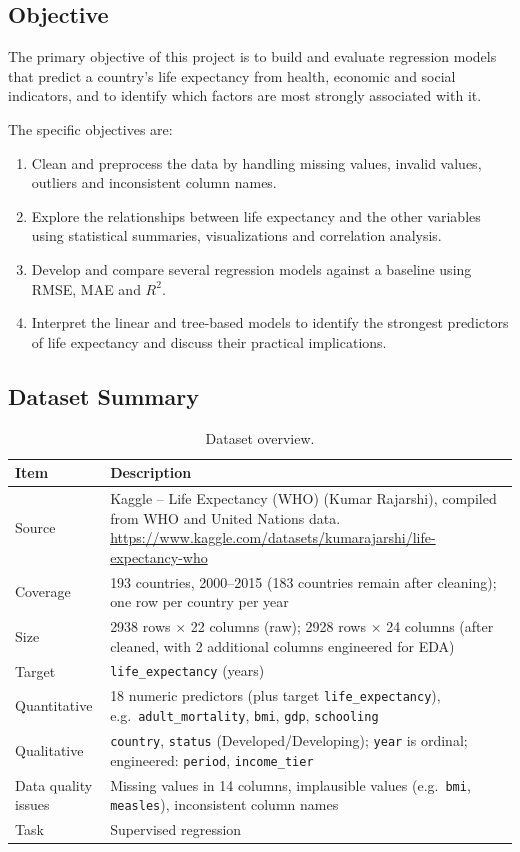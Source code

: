 \documentclass[12pt,a4paper]{article}
\begin{document}
\subsection{Objective}
The primary objective of this project is to build and evaluate regression models
that predict a country's life expectancy from health, economic and social
indicators, and to identify which factors are most strongly associated with it.

The specific objectives are:
\begin{enumerate}
  \item Clean and preprocess the data by handling missing values, invalid
        values, outliers and inconsistent column names.
  \item Explore the relationships between life expectancy and the other
        variables using statistical summaries, visualizations and correlation
        analysis.
  \item Develop and compare several regression models against a baseline using
        RMSE, MAE and $R^2$.
  \item Interpret the linear and tree-based models to identify the strongest
        predictors of life expectancy and discuss their practical implications.
\end{enumerate}

\subsection{Dataset Summary}
\begin{table}[H]\centering
\caption{Dataset overview.}
\begin{tabularx}{\textwidth}{lX}\toprule
\textbf{Item} & \textbf{Description}\\\midrule
Source & Kaggle -- Life Expectancy (WHO) (Kumar Rajarshi), compiled from WHO and United Nations data. \url{https://www.kaggle.com/datasets/kumarajarshi/life-expectancy-who}\\
Coverage & 193 countries, 2000--2015 (183 countries remain after cleaning); one row per country per year\\
Size & 2938 rows $\times$ 22 columns (raw); 2928 rows $\times$ 24 columns (after cleaned, with 2 additional columns engineered for EDA)\\
Target & \texttt{life\_expectancy} (years)\\
Quantitative & 18 numeric predictors (plus target \texttt{life\_expectancy}), e.g.\ \texttt{adult\_mortality}, \texttt{bmi}, \texttt{gdp}, \texttt{schooling}\\
Qualitative & \texttt{country}, \texttt{status} (Developed/Developing); \texttt{year} is ordinal; engineered: \texttt{period}, \texttt{income\_tier}\\
Data quality issues & Missing values in 14 columns, implausible values (e.g.\ \texttt{bmi}, \texttt{measles}), inconsistent column names\\
Task & Supervised regression\\\bottomrule
\end{tabularx}
\end{table}
\end{document}
